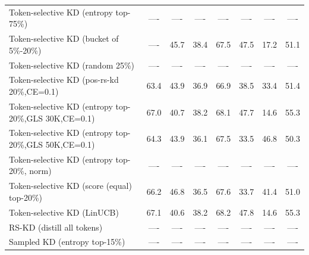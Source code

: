 \documentclass[11pt]{article}
\begin{document}
\begin{table}[t]
{\begin{tabular}{lccccccc}
		Token-selective KD (entropy top-75\%)      & ----    & ----                  & ----                      & ----                 & ----                        & ----                    & ----          \\
		Token-selective KD (bucket of 5\%-20\%)    & ----    & 45.7                  & 38.4                      & 67.5                 & 47.5                        & 17.2                    & 51.1          \\
		Token-selective KD (random 25\%)           & ----    & ----                  & ----                      & ----                 & ----                        & ----                    & ----          \\
		Token-selective KD (pos-rs-kd 20\%,CE=0.1) & 63.4    & 43.9                  & 36.9                      & 66.9                 & 38.5                        & 33.4                    & 51.4          \\
		Token-selective KD (entropy top-20\%,GLS 30K,CE=0.1) & 67.0    & 40.7        & 38.2                      & 68.1                 & 47.7                        & 14.6                    & 55.3          \\
		Token-selective KD (entropy top-20\%,GLS 50K,CE=0.1) & 64.3    & 43.9        & 36.1                      & 67.5                 & 33.5                        & 46.8                    & 50.3          \\
		Token-selective KD (entropy top-20\%, norm)& ----    & ----                  & ----                      & ----                 & ----                        & ----                    & ----          \\
		Token-selective KD (score (equal) top-20\%)& 66.2    & 46.8                  & 36.5                      & 67.6                 & 33.7                        & 41.4                    & 51.0          \\
		Token-selective KD (LinUCB)			       & 67.1    & 40.6                  & 38.2                      & 68.2                 & 47.8                        & 14.6                    & 55.3          \\
		\midrule
		RS-KD (distill all tokens)	               & ----    & ----                  & ----                      & ----                 & ----                        & ----                    & ----          \\
		Sampled KD (entropy top-15\%)              & ----    & ----                  & ----                      & ----                 & ----                        & ----                    & ----          \\

\end{tabular}}
\end{table}
\end{document}
